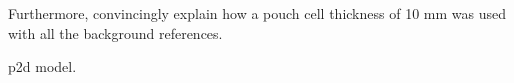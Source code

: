  Furthermore, convincingly explain how a pouch cell thickness of 10 mm
was used with all the background references.



\gls{p2d} model. %








